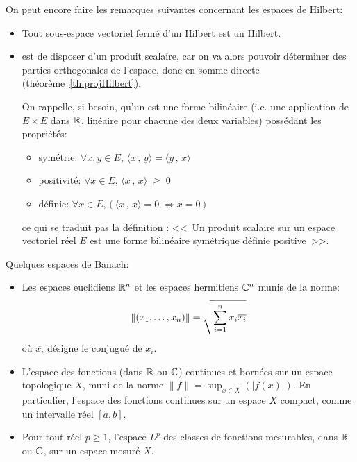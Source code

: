 \medskip
On peut encore faire les remarques suivantes concernant les espaces de Hilbert:
\begin{itemize}
   \item Tout sous-espace vectoriel fermé d'un Hilbert est un Hilbert.
   \item {} est de disposer d'un produit scalaire, car on va alors pouvoir déterminer des parties
	orthogonales de l'espace, donc en somme directe (théorème~\ref{th:projHilbert}).

	On rappelle, si besoin, qu'un   est une
	forme bilinéaire (i.e. une application de $E\times E$
	dans $\mathbb R$, linéaire pour chacune des deux variables) possédant les propriétés:
	\begin{itemize}
	   \item symétrie: $\forall x,y \in E$, $\langle x\, , \, y \rangle = \langle y\, , \, x\rangle$
	   \item positivité: $\forall x \in E$, $\langle x\, , \, x \rangle \; \ge \; 0$
	   \item définie: $\forall x \in E$,  $\big(\ \langle x\, , \, x \rangle = 0 \; \Rightarrow x = 0\ \big)$
	\end{itemize}
	ce qui se traduit pas la définition : <<~Un produit scalaire sur un espace vectoriel réel $E$ est une
	forme bilinéaire symétrique définie positive~>>.
\end{itemize}


\medskip
Quelques espaces de Banach:
\begin{itemize}
\item Les espaces euclidiens $\mathbb R^n$ et
les espaces hermitiens $\mathbb C^n$
munis de la norme:
\begin{equation}\|(x_1,\ldots,x_n)\| = \sqrt{\displaystyle\sum_{i=1}^n x_i \overline{x_i}}\end{equation} où $\overline{x_i}$
désigne le conjugué de $x_i$.

\item L'espace des fonctions (dans $\mathbb R$ ou $\mathbb C$) continues et bornées sur un espace topologique $X$,
muni de la norme $\|f\| = \sup_{x \in X}(|f(x)|)$.
En particulier, l'espace des fonctions continues sur un espace $X$ compact, comme un intervalle réel $[a,b]$.

\item Pour tout réel $p \ge 1$, l'espace $L^p$ des classes de fonctions mesurables, dans $\mathbb R$ ou $\mathbb C$, sur un espace mesuré $X$.
\end{itemize}

